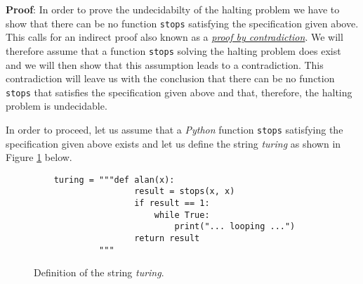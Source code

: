 \noindent
\textbf{Proof}:  In order to prove the undecidabilty of the halting problem we have to show that
there can be no function \texttt{stops} satisfying the specification given above.  This calls for an
indirect proof also known as a \href{http://en.wikipedia.org/wiki/Indirect_proof}{\emph{proof by contradiction}}.
We will therefore assume that a function \texttt{stops} solving the halting problem does
exist and we will then show that this assumption leads to a contradiction.  This contradiction will
leave us with the conclusion that there can be no function \texttt{stops} that satisfies
the specification given above and that, therefore, the halting problem is undecidable.

In order to proceed, let us assume that a \textsl{Python} function \texttt{stops}
satisfying the specification given above exists and let us define the string
\textsl{turing} as shown in Figure \ref{fig:turing-string} below.

\begin{figure}[!h]
  \centering
\begin{verbatim}  
    turing = """def alan(x):
                    result = stops(x, x)
                    if result == 1:
                        while True:
                            print("... looping ...")
                    return result
             """ 
\end{verbatim}
  \vspace*{-0.3cm}
  \caption{Definition of the string \textsl{turing}.}
  \label{fig:turing-string}
\end{figure}

